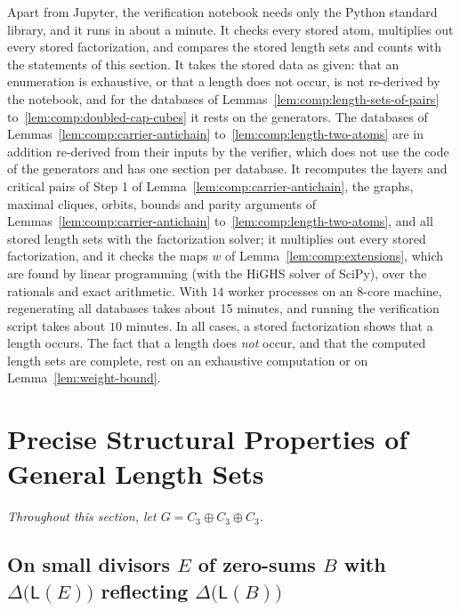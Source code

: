 \documentclass[a4paper, 10pt]{amsart}
\theoremstyle{plain}
\theoremstyle{definition}
\theoremstyle{definition}
\numberwithin{equation}{section}
\begin{document}
Apart from Jupyter, the verification notebook needs only the Python standard
library, and it runs in about a minute.  It checks every stored atom, multiplies out every stored
factorization, and compares the stored length sets and counts with the
statements of this section.  It takes the stored data as given: that an
enumeration is exhaustive, or that a length does not occur, is not re-derived
by the notebook, and for the databases of
Lemmas~\ref{lem:comp:length-sets-of-pairs} to~\ref{lem:comp:doubled-cap-cubes}
it rests on the generators.  The databases of
Lemmas~\ref{lem:comp:carrier-antichain} to~\ref{lem:comp:length-two-atoms}
are in addition re-derived from their inputs by the verifier, which does not
use the code of the generators and has one section per database.  It recomputes the layers and
critical pairs of Step 1 of Lemma~\ref{lem:comp:carrier-antichain}, the
graphs, maximal cliques, orbits, bounds and parity arguments of
Lemmas~\ref{lem:comp:carrier-antichain} to~\ref{lem:comp:length-two-atoms},
and all stored length sets with the factorization solver; it multiplies out
every stored factorization, and it checks the maps $w$ of
Lemma~\ref{lem:comp:extensions}, which are found by linear programming (with
the HiGHS solver of SciPy), over the rationals and exact arithmetic.
With $14$ worker
processes on an $8$-core machine, regenerating all databases takes
about 15 minutes, and running the verification script takes about $10$ minutes.
In all cases, a stored factorization shows that a
length occurs. The fact that a length does \emph{not} occur,
and that the computed length sets are complete, rest on
an exhaustive computation or on Lemma~\ref{lem:weight-bound}.

\section{Precise Structural Properties of General Length Sets} \label{5}


\smallskip

\centerline{\it Throughout this section, let $G = C_3 \oplus C_3 \oplus C_3$.}

\smallskip


\subsection{On small divisors $E$ of zero-sums $B$ with $\Delta \big( \mathsf L (E) \big)$ reflecting $\Delta \big( \mathsf L (B) \big)$} \label{sec:structural-lemmas}
\end{document}
